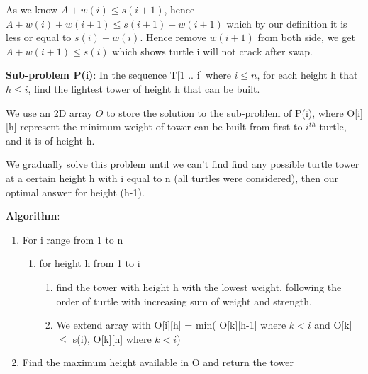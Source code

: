 \documentclass{article}
\begin{document}
As we know $A + w(i) \leq s(i+1)$, hence $A + w(i) + w(i+1) \leq s(i+1) + w(i+1)$ which by our definition it is less or equal to $ s(i) + w(i)$. Hence remove $w(i+1)$ from both side, we get $A + w(i+1) \leq s(i)$ which shows turtle i will not crack after swap.


\textbf{Sub-problem P(i)}: In the sequence T[1 .. i] where $i \leq n$, for each height h that $h\leq i$, find the lightest tower of height h that can be built.

We use an 2D array $O$ to store the solution to the sub-problem of P(i), where O[i][h] represent the minimum weight of tower can be built from first to $i^{th}$ turtle, and it is of height h.

We gradually solve this problem until we can't find find any possible turtle tower at a certain height h with i equal to n (all turtles were considered), then our optimal answer for height (h-1).\newline

\textbf{Algorithm}:

\begin{enumerate}
\item For i range from 1 to n
  \begin{enumerate}
  \item for height h from 1 to i
    \begin{enumerate}
    \item find the tower with height h with the lowest weight, following the order of turtle with increasing sum of weight and strength.
    \item  We extend array with O[i][h] = min( O[k][h-1] where $k < i$ and O[k] $\leq$ s(i), O[k][h] where $k < i$)
    \end{enumerate}
  \end{enumerate}

\item Find the maximum height available in O and return the tower
\end{enumerate}
\end{document}
